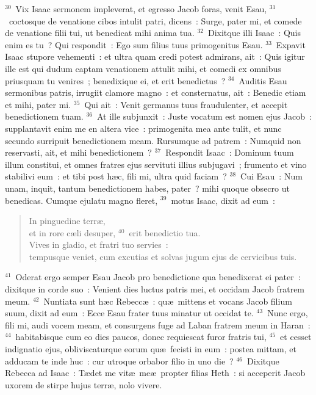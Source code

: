 ${}^{30}$~Vix Isaac sermonem impleverat, et egresso Jacob foras, venit Esau,
${}^{31}$~coctosque de venatione cibos intulit patri, dicens~: Surge, pater mi, et comede de venatione filii tui, ut benedicat mihi anima tua.
${}^{32}$~Dixitque illi Isaac~: Quis enim es tu~? Qui respondit~: Ego sum filius tuus primogenitus Esau.
${}^{33}$~Expavit Isaac stupore vehementi~: et ultra quam credi potest admirans, ait~: Quis igitur ille est qui dudum captam venationem attulit mihi, et comedi ex omnibus priusquam tu venires~; benedixique ei, et erit benedictus~?
${}^{34}$~Auditis Esau sermonibus patris, irrugiit clamore magno~: et consternatus, ait~: Benedic etiam et mihi, pater mi.
${}^{35}$~Qui ait~: Venit germanus tuus fraudulenter, et accepit benedictionem tuam.
${}^{36}$~At ille subjunxit~: Juste vocatum est nomen ejus Jacob~: supplantavit enim me en altera vice~: primogenita mea ante tulit, et nunc secundo surripuit benedictionem meam. Rursumque ad patrem~: Numquid non reservasti, ait, et mihi benedictionem~?
${}^{37}$~Respondit Isaac~: Dominum tuum illum constitui, et omnes fratres ejus servituti illius subjugavi~; frumento et vino stabilivi eum~: et tibi post h\ae c, fili mi, ultra quid faciam~?
${}^{38}$~Cui Esau~: Num unam, inquit, tantum benedictionem habes, pater~? mihi quoque obsecro ut benedicas. Cumque ejulatu magno fleret,
${}^{39}$~motus Isaac, dixit ad eum~: \begin{flushleft}\begin{verse}In pinguedine terr\ae ,\\ et in rore c\ae li desuper,
${}^{40}$~erit benedictio tua.\\ Vives in gladio, et fratri tuo servies~:\\ tempusque veniet, cum excutias et solvas jugum ejus de cervicibus tuis.\end{verse}\end{flushleft}


${}^{41}$~Oderat ergo semper Esau Jacob pro benedictione qua benedixerat ei pater~: dixitque in corde suo~: Venient dies luctus patris mei, et occidam Jacob fratrem meum.
${}^{42}$~Nuntiata sunt h\ae c Rebecc\ae~: qu\ae\ mittens et vocans Jacob filium suum, dixit ad eum~: Ecce Esau frater tuus minatur ut occidat te.
${}^{43}$~Nunc ergo, fili mi, audi vocem meam, et consurgens fuge ad Laban fratrem meum in Haran~:
${}^{44}$~habitabisque cum eo dies paucos, donec requiescat furor fratris tui,
${}^{45}$~et cesset indignatio ejus, obliviscaturque eorum qu\ae\ fecisti in eum~: postea mittam, et adducam te inde huc~: cur utroque orbabor filio in uno die~?
${}^{46}$~Dixitque Rebecca ad Isaac~: T\ae det me vit\ae\ me\ae\ propter filias Heth~: si acceperit Jacob uxorem de stirpe hujus terr\ae , nolo vivere.

